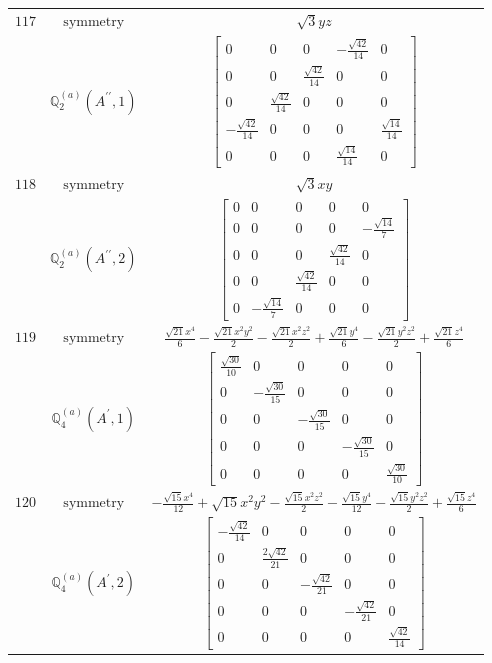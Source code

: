 \documentclass[fleqn,8pt,landscape]{jsarticle}
\begin{document}
\begin{longtable}{ccc}
$ 117 $ & $ \text{symmetry} $ & $ \sqrt{3} y z $ \\
$  $ & $ \mathbb{Q}_{2}^{(a)}(A^{\prime\prime},1) $ & $ \begin{bmatrix} 0 & 0 & 0 & - \frac{\sqrt{42}}{14} & 0 \\ 0 & 0 & \frac{\sqrt{42}}{14} & 0 & 0 \\ 0 & \frac{\sqrt{42}}{14} & 0 & 0 & 0 \\ - \frac{\sqrt{42}}{14} & 0 & 0 & 0 & \frac{\sqrt{14}}{14} \\ 0 & 0 & 0 & \frac{\sqrt{14}}{14} & 0 \end{bmatrix} $ \\ \hline
$ 118 $ & $ \text{symmetry} $ & $ \sqrt{3} x y $ \\
$  $ & $ \mathbb{Q}_{2}^{(a)}(A^{\prime\prime},2) $ & $ \begin{bmatrix} 0 & 0 & 0 & 0 & 0 \\ 0 & 0 & 0 & 0 & - \frac{\sqrt{14}}{7} \\ 0 & 0 & 0 & \frac{\sqrt{42}}{14} & 0 \\ 0 & 0 & \frac{\sqrt{42}}{14} & 0 & 0 \\ 0 & - \frac{\sqrt{14}}{7} & 0 & 0 & 0 \end{bmatrix} $ \\ \hline
$ 119 $ & $ \text{symmetry} $ & $ \frac{\sqrt{21} x^{4}}{6} - \frac{\sqrt{21} x^{2} y^{2}}{2} - \frac{\sqrt{21} x^{2} z^{2}}{2} + \frac{\sqrt{21} y^{4}}{6} - \frac{\sqrt{21} y^{2} z^{2}}{2} + \frac{\sqrt{21} z^{4}}{6} $ \\
$  $ & $ \mathbb{Q}_{4}^{(a)}(A^{\prime},1) $ & $ \begin{bmatrix} \frac{\sqrt{30}}{10} & 0 & 0 & 0 & 0 \\ 0 & - \frac{\sqrt{30}}{15} & 0 & 0 & 0 \\ 0 & 0 & - \frac{\sqrt{30}}{15} & 0 & 0 \\ 0 & 0 & 0 & - \frac{\sqrt{30}}{15} & 0 \\ 0 & 0 & 0 & 0 & \frac{\sqrt{30}}{10} \end{bmatrix} $ \\ \hline
$ 120 $ & $ \text{symmetry} $ & $ - \frac{\sqrt{15} x^{4}}{12} + \sqrt{15} x^{2} y^{2} - \frac{\sqrt{15} x^{2} z^{2}}{2} - \frac{\sqrt{15} y^{4}}{12} - \frac{\sqrt{15} y^{2} z^{2}}{2} + \frac{\sqrt{15} z^{4}}{6} $ \\
$  $ & $ \mathbb{Q}_{4}^{(a)}(A^{\prime},2) $ & $ \begin{bmatrix} - \frac{\sqrt{42}}{14} & 0 & 0 & 0 & 0 \\ 0 & \frac{2 \sqrt{42}}{21} & 0 & 0 & 0 \\ 0 & 0 & - \frac{\sqrt{42}}{21} & 0 & 0 \\ 0 & 0 & 0 & - \frac{\sqrt{42}}{21} & 0 \\ 0 & 0 & 0 & 0 & \frac{\sqrt{42}}{14} \end{bmatrix} $ \\ \hline

\end{longtable}
\end{document}
